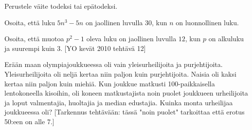 \begin{kotitehtavasivu}
\begin{tehtava}
    \begin{vastaus}
        \begin{alakohdat}
        \end{alakohdat}
    \end{vastaus}
    
\end{tehtava}

\begin{tehtava}
    Perustele väite todeksi tai epätodeksi.
    \begin{alakohdat}
    \end{alakohdat}

    \begin{vastaus}
        \begin{alakohdat}
        \end{alakohdat}
    \end{vastaus}
    
\end{tehtava}

\begin{tehtava}
    Osoita, että luku $5n^3 - 5n$ on jaollinen luvulla $30$, kun $n$ on luonnollinen luku.
\end{tehtava}

\begin{tehtava}
    Osoita, että muotoa $p^2 - 1$ oleva luku on jaollinen luvulla $12$, kun $p$ on alkuluku ja suurempi kuin $3$. [YO kevät 2010 tehtävä 12]
\end{tehtava}

\begin{tehtava}
    Erään maan olympiajoukkueessa oli vain yleisurheilijoita ja
    purjehtijoita. Yleisurheilijoita oli neljä kertaa niin paljon kuin
    purjehtijoita. Naisia oli kaksi kertaa niin paljon kuin miehiä.
    Kun joukkue matkusti 100-paikkaisella lentokoneella kisoihin,
    oli koneen matkustajista noin puolet joukkueen urheilijoita ja
    loput valmentajia, huoltajia ja median edustajia. Kuinka monta
    urheilijaa joukkueessa oli? [Tarkennus tehtävään: tässä "noin puolet" tarkoittaa että erotus 50:een on alle 7.] %
    

\end{tehtava}
\end{kotitehtavasivu}
